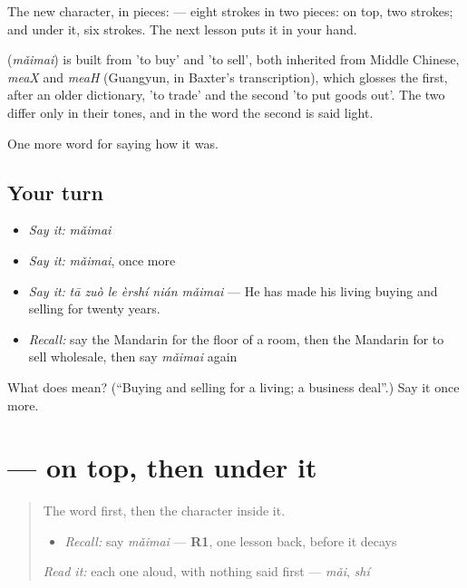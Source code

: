 The new character, in pieces:  — eight strokes in two pieces:  on top, two strokes; and  under it, six strokes. The next lesson puts it in your hand.

\begin{cousinweb}
\textbf{} (\emph{mǎimai}) is built from  'to buy' and  'to sell', both inherited from Middle Chinese, \emph{meaX} and \emph{meaH} (Guangyun, in Baxter's transcription), which glosses the first, after an older dictionary, 'to trade' and the second 'to put goods out'. The two differ only in their tones, and in the word the second is said light.
\end{cousinweb}

\begin{grammarlens}[title={What you've built}]
One more word for saying how it was.
\end{grammarlens}

\subsection*{Your turn}
\begin{itemize}
\raggedright
  \item \emph{Say it:} \emph{mǎimai}
  \item \emph{Say it:} \emph{mǎimai}, once more
  \item \emph{Say it:} \emph{tā zuò le èrshí nián mǎimai} — He has made his living buying and selling for twenty years.
  \item \emph{Recall:} say the Mandarin for the floor of a room, then the Mandarin for to sell wholesale, then say \emph{mǎimai} again
\end{itemize}

\begin{tcolorbox}[breakable,colback=teal!4,colframe=teal!35!black,title={Before you move on}]
What does  mean? (\textquotedblleft{}Buying and selling for a living; a business deal\textquotedblright{}.) Say it once more.
\end{tcolorbox}
\section[\texorpdfstring{\zh{卖} (mài)}{卖 (mài)}]{ —  on top, then  under it}

\label{lesson:ZH-W523-mai-sell}



\begin{quote}
The word first, then the character inside it.

\begin{itemize}
\raggedright
  \item \emph{Recall:} say \emph{mǎimai} — \textbf{R1}, one lesson back, before it decays
\end{itemize}

\begin{quote}
 
\end{quote}

\emph{Read it:} each one aloud, with nothing said first — \emph{mǎi}, \emph{shí}
\end{quote}

